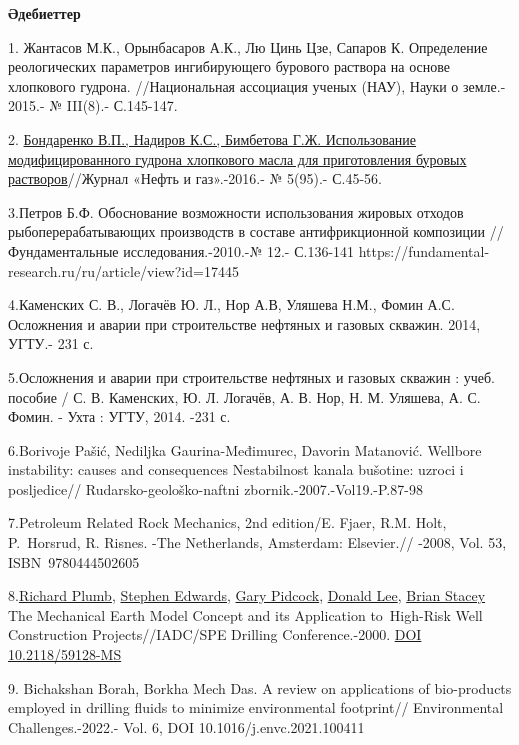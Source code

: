 \begin{center}
{\bfseries Әдебиеттер}
\end{center}

\begin{references}

1. Жантасов М.К., Орынбасаров А.К., Лю Цинь Цзе, Сапаров К. Определение
реологических параметров ингибирующего бурового раствора на основе
хлопкового гудрона. //Национальная ассоциация ученых (НАУ), Науки о
земле.- 2015.- № III(8).- С.145-147.

2.
\href{http://neft-gas.kz/f/no_5_2016_neft_i_gaz-dlya_sajta2-1.pdf}{Бондаренко
В.П., Надиров К.С., Бимбетова Г.Ж. Использование модифицированного
гудрона хлопкового масла для приготовления буровых растворов}//Журнал
«Нефть и газ».-2016.- № 5(95).- С.45-56.

3.Петров Б.Ф. Обоснование возможности использования жировых отходов
рыбоперерабатывающих производств в составе антифрикционной композиции //
Фундаментальные исследования.-2010.-№ 12.- С.136-141
https://fundamental-research.ru/ru/article/view?id=17445

4.Каменских С. В., Логачёв Ю. Л., Нор А.В, Уляшева Н.М., Фомин А.С.
Осложнения и аварии при строительстве нефтяных и газовых скважин. 2014,
УГТУ.- 231 с.

5.Осложнения и аварии при строительстве нефтяных и газовых скважин :
учеб. пособие / С. В. Каменских, Ю. Л. Логачёв, А. В. Нор, Н. М.
Уляшева, А. С. Фомин. - Ухта : УГТУ, 2014. -231 с.

6.Borivoje Pašić, Nediljka Gaurina-Međimurec, Davorin Matanović.
Wellbore instability: causes and \linebreak consequences Nestabilnost kanala
bušotine: uzroci i posljedice// Rudarsko-geološko-naftni
zbornik.-2007.-Vol19.-P.87-98

7.Petroleum Related Rock Mechanics, 2nd edition/E. Fjaer, R.M. Holt,
P.~Horsrud, R. Risnes. \linebreak -The Netherlands, Amsterdam: Elsevier.// -2008,
Vol. 53, ISBN~9780444502605

8.\href{javascript:;}{Richard Plumb}, \href{javascript:;}{Stephen
Edwards}, \href{javascript:;}{Gary Pidcock}, \href{javascript:;}{Donald
Lee}, \href{javascript:;}{Brian Stacey} The Mechanical Earth Model
Concept and its Application to~High-Risk Well Construction
Projects//IADC/SPE Drilling Conference.-2000.
\href{https://doi.org/10.2118/59128-MS}{DOI 10.2118/59128-MS}

9. Bichakshan Borah, Borkha Mech Das. A review on applications of
bio-products employed in drilling fluids to minimize environmental
footprint// Environmental Challenges.-2022.- Vol. 6, \linebreak DOI
10.1016/j.envc.2021.100411


\end{references}
